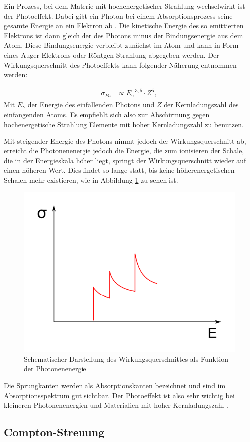 \documentclass[
	parskip=half,10pt,
	numbers= noenddot, %
	toc=flat, %
	oneside,
	twocolumn,
	]{scrartcl}
\begin{document}
Ein Prozess, bei dem Materie mit hochenergetischer Strahlung wechselwirkt ist der Photoeffekt. Dabei gibt ein Photon bei einem Absorptionsprozess seine gesamte Energie 
an ein Elektron ab \cite{schatz}. Die kinetische Energie des so emittierten Elektrons ist dann gleich der des Photons minus der Bindungsenergie aus dem Atom. Diese 
Bindungsenergie verbleibt zunächst im Atom und kann in Form eines Auger-Elektrons oder Röntgen-Strahlung abgegeben werden. Der Wirkungsquerschnitt 
des Photoeffekts kann folgender Näherung entnommen werden:

\begin{align}
\sigma_{Ph} &\propto E^{-3,5}_{\gamma} \cdot Z^5,
\end{align}
Mit $E_{\gamma}$ der Energie des einfallenden Photons und $Z$ der Kernladungszahl des einfangenden Atoms. Es empfiehlt sich also zur Abschirmung gegen hochenergetische 
Strahlung Elemente mit hoher Kernladungszahl zu benutzen. 

Mit steigender Energie des Photons nimmt jedoch der Wirkungsquerschnitt ab, erreicht die Photonenenergie jedoch die Energie, die zum ionisieren der Schale, die in 
der Energieskala höher liegt, springt der Wirkungsquerschnitt wieder auf einen höheren Wert. Dies findet so lange statt, bis keine höherenergetischen Schalen mehr 
existieren, wie in Abbildung \ref{fig:absorption} zu sehen ist. 

\begin{figure}[h]
\centering
\includegraphics[width=.4\textwidth]{images/kante.png}
\caption{Schematischer Darstellung des Wirkungsquerschnittes als Funktion der Photonenenergie \cite{wikipedia}}
\label{fig:absorption}
\end{figure}

Die Sprungkanten werden als Absorptionskanten bezeichnet und sind im Absorptionsspektrum gut sichtbar. Der Photoeffekt ist also sehr wichtig bei kleineren Photonenenergien 
und Materialien mit hoher Kernladungszahl \cite{schatz}.

\subsection{Compton-Streuung}
\end{document}
